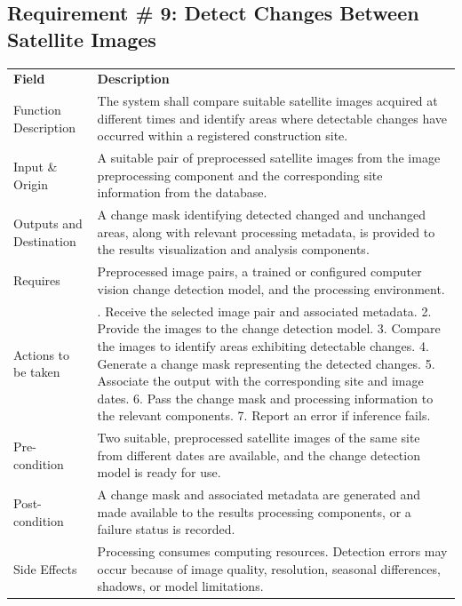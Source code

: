 \documentclass[12pt,a4paper]{report}
\begin{document}
\subsection{Requirement \# 9: Detect Changes Between Satellite
Images}\label{requirement-9-detect-changes-between-satellite-images}

\begin{longtable}[]{@{}
  >{\raggedright\arraybackslash}p{}
  >{\raggedright\arraybackslash}p{}@{}}
\toprule\noalign{}
\endhead
\bottomrule\noalign{}
\endlastfoot
\textbf{Field} & \textbf{Description} \\
Function Description & The system shall compare suitable satellite
images acquired at different times and identify areas where detectable
changes have occurred within a registered construction site. \\
Input \& Origin & A suitable pair of preprocessed satellite images from
the image preprocessing component and the corresponding site information
from the database. \\
Outputs and Destination & A change mask identifying detected changed and
unchanged areas, along with relevant processing metadata, is provided to
the results visualization and analysis components. \\
Requires & Preprocessed image pairs, a trained or configured computer
vision change detection model, and the processing environment. \\
Actions to be taken & 1. Receive the selected image pair and associated
metadata. 2. Provide the images to the change detection model. 3.
Compare the images to identify areas exhibiting detectable changes. 4.
Generate a change mask representing the detected changes. 5. Associate
the output with the corresponding site and image dates. 6. Pass the
change mask and processing information to the relevant components. 7.
Report an error if inference fails. \\
Pre-condition & Two suitable, preprocessed satellite images of the same
site from different dates are available, and the change detection model
is ready for use. \\
Post-condition & A change mask and associated metadata are generated and
made available to the results processing components, or a failure status
is recorded. \\
Side Effects & Processing consumes computing resources. Detection errors
may occur because of image quality, resolution, seasonal differences,
shadows, or model limitations. \\
\end{longtable}
\end{document}
